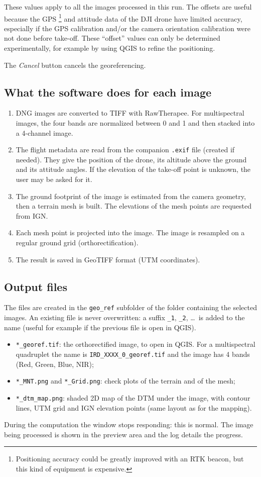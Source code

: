 \documentclass[a4paper,11pt]{report}
\begin{document}
These values apply to all the images processed in this run. The offsets are useful because the GPS
\footnote{Positioning accuracy could be greatly improved with an RTK beacon, but this kind of equipment is expensive.} and attitude data of the DJI drone have limited accuracy, especially if the GPS calibration and/or the camera orientation calibration were not done before take-off. These ``offset'' values can only be determined experimentally, for example by using QGIS to refine the positioning.

 The \emph{Cancel} button cancels the georeferencing.

\subsection*{What the software does for each image}
\begin{enumerate}
	\item DNG images are converted to TIFF with RawTherapee. For multispectral images, the four bands are normalized between 0 and 1 and then stacked into a 4-channel image.
	\item The flight metadata are read from the companion \texttt{.exif} file (created if needed). They give the position of the drone, its altitude above the ground and its attitude angles. If the elevation of the take-off point is unknown, the user may be asked for it.
	\item The ground footprint of the image is estimated from the camera geometry, then a terrain mesh is built. The elevations of the mesh points are requested from IGN.
	\item Each mesh point is projected into the image. The image is resampled on a regular ground grid (orthorectification).
	\item The result is saved in GeoTIFF format (UTM coordinates).
\end{enumerate}

\subsection*{Output files}
The files are created in the \texttt{geo\_ref} subfolder of the folder containing the selected images. An existing file is never overwritten: a suffix \texttt{\_1}, \texttt{\_2}, \dots~is added to the name (useful for example if the previous file is open in QGIS).
\begin{itemize}
	\item \texttt{*\_georef.tif}: the orthorectified image, to open in QGIS. For a multispectral quadruplet the name is \texttt{IRD\_XXXX\_0\_georef.tif} and the image has 4 bands (Red, Green, Blue, NIR);
	\item \texttt{*\_MNT.png} and \texttt{*\_Grid.png}: check plots of the terrain and of the mesh;
	\item \texttt{*\_dtm\_map.png}: shaded 2D map of the DTM under the image, with contour lines, UTM grid and IGN elevation points 	(same layout as for the mapping).
	\end{itemize}
	During the computation the window stops responding: this is normal. The image being processed is shown in the preview area and the log details the progress.
\end{document}
